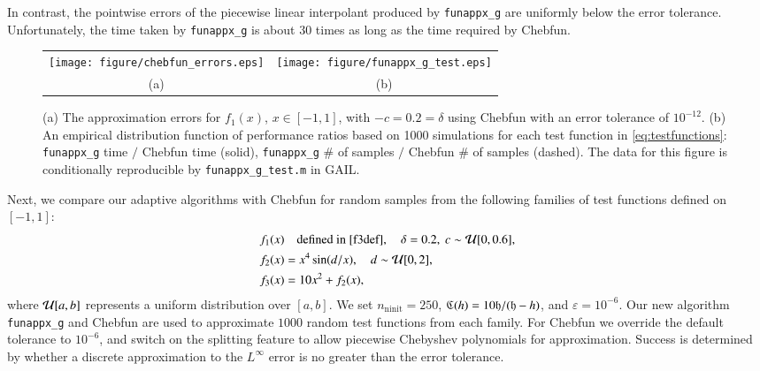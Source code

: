 \documentclass[review]{elsarticle}
\newcommand{\abstol}{\varepsilon}
\theoremstyle{definition}
\DeclareMathOperator{\ninit}{ninit}
\newtheorem{exmp}{Example}
\newcommand{\funappxg}{\texttt{funappx\_g}\xspace}
\begin{document}
In contrast, the pointwise errors of the piecewise linear interpolant produced
by \funappxg{} are uniformly below the error tolerance. Unfortunately, the time
taken by \funappxg{} is about $30$ times as long as the time
required by Chebfun.

\begin{figure}[tb]
\centering
\begin{tabular}{cc}
\texttt{[image: figure/chebfun\_errors.eps]} \hspace{-2.5ex} &
\texttt{[image: figure/funappx\_g\_test.eps]}
\\ (a) & (b)
\end{tabular}
\caption{(a) The approximation errors for $f_1(x)$, $x \in [-1,1]$, with $-c = 0.2=\delta$
using  Chebfun with an error tolerance of $10^{-12}$.
(b) An empirical distribution function of performance ratios based on 1000
simulations for each test function in \eqref{eq:testfunctions}:
\funappxg{} time $/$ Chebfun time (solid), \funappxg{} \# of samples $/$
Chebfun \# of samples (dashed).
The data for this figure is conditionally reproducible
by
\texttt{funappx\_g\_test.m} in GAIL.
\label{f3chebfig}} %
\end{figure}




Next, we compare our adaptive algorithms with Chebfun  for random samples from the
following families of test functions defined on $ [-1, 1]$:
\begin{subequations} \label{eq:testfunctions}
\begin{align}
f_1(x) & \quad \text{defined in \eqref{f3def}}, \quad \delta = 0.2, \ c \sim \mathcal{U}[0,0.6], \\
f_2(x) &= x^4 \sin(d/x), \quad d \sim \mathcal{U}[0,2], \\
f_3(x) &= 10  x^2 + f_2(x),
\end{align}
\end{subequations}
where  $\mathcal{U}[a,b]$ represents a uniform distribution over $[a,b]$.
We set $n_{\ninit}= 250$, $\mathfrak{C} (h) =
10 \mathfrak{h}/(\mathfrak{h}-h)$, and $\abstol = 10^{-6}$. Our new algorithm \texttt{funappx\_g}
and Chebfun are
used to approximate $1000$ random test functions from each family. For Chebfun we
override the default tolerance to $10^{-6}$, and switch on the splitting
feature to allow piecewise Chebyshev polynomials for approximation.  Success  is
determined by whether a discrete approximation to the $L^{\infty}$ error is
no greater than the error tolerance.
\end{document}
